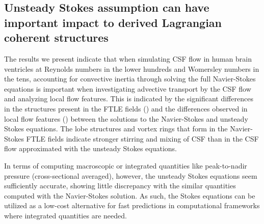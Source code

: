 \documentclass{template}
\begin{document}
\subsection{Unsteady Stokes assumption can have important impact to derived Lagrangian coherent structures}
The results we present indicate that when simulating CSF flow
in human brain ventricles at Reynolds numbers in the lower hundreds
and Womersley numbers in the tens,
accounting for convective inertia through
solving the full Navier-Stokes equations is important when investigating
advective transport by the CSF flow and analyzing local flow features.
This is indicated by the significant differences in the structures
present in the FTLE fields () and the
differences observed in local flow features ()
between the solutions to the Navier-Stokes and unsteady Stokes equations. The lobe structures and
vortex rings that form in the Navier-Stokes FTLE fields
indicate stronger stirring and mixing of
CSF than in the CSF flow approximated with the unsteady Stokes equations.

In terms of computing macroscopic or integrated quantities like peak-to-nadir pressure (cross-sectional averaged),
however, the unsteady Stokes equations seem sufficiently accurate, showing little discrepancy with
the similar quantities computed with the Navier-Stokes solution. As such, the Stokes equations can be
utilized as a low-cost alternative for fast predictions
in computational frameworks where integrated quantities are needed.
\end{document}
